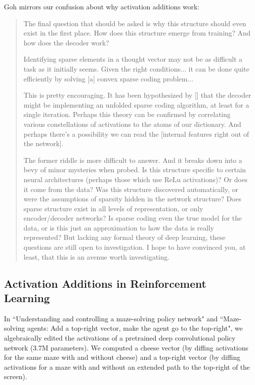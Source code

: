 \documentclass[10pt]{article}
\begin{document}
Goh mirrors our confusion about why activation additions work:

\begin{quote}
The final question that should be asked is why this structure should even exist in the first place. How does this structure emerge from training? And how does the decoder work?

Identifying sparse elements in a thought vector may not be as difficult a task as it initially seems. Given the right conditions... it can be done quite efficiently by solving [a] convex sparse coding problem...

This is pretty encouraging. It has been hypothesized by [\citet{46f49a297c8542aa80d7fad85aed17e0}] that the decoder might be implementing an unfolded sparse coding algorithm, at least for a single iteration. Perhaps this theory can be confirmed by correlating various constellations of activations to the atoms of our dictionary. And perhaps there's a possibility we can read the [internal features right out of the network].

The former riddle is more difficult to answer. And it breaks down into a bevy of minor mysteries when probed. Is this structure specific to certain neural architectures (perhaps those which use ReLu activations)? Or does it come from the data? Was this structure discovered automatically, or were the assumptions of sparsity hidden in the network structure? Does sparse structure exist in all levels of representation, or only encoder/decoder networks? Is sparse coding even the true model for the data, or is this just an approximation to how the data is really represented? But lacking any formal theory of deep learning, these questions are still open to investigation. I hope to have convinced you, at least, that this is an avenue worth investigating.
\end{quote}

\subsection{Activation Additions in Reinforcement Learning}
In ``Understanding and controlling a maze-solving policy network" and ``Maze-solving agents: Add a top-right vector, make the agent go to the top-right", we algebraically edited the activations of a pretrained deep convolutional policy network (3.7M parameters). We computed a cheese vector (by diffing activations for the same maze with and without cheese) and a top-right vector (by diffing activations for a maze with and without an extended path to the top-right of the screen). 
\end{document}
